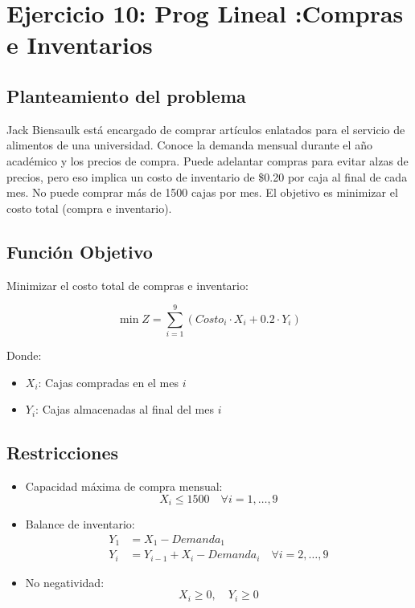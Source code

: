 \documentclass[12pt, a4paper, oneside]{book}
\theoremstyle{definition}
\begin{document}
\newpage
\section{Ejercicio 10: Prog Lineal :Compras e Inventarios}

\subsection{Planteamiento del problema}
Jack Biensaulk está encargado de comprar artículos enlatados para el servicio de alimentos de una universidad. Conoce la demanda mensual durante el año académico y los precios de compra. Puede adelantar compras para evitar alzas de precios, pero eso implica un costo de inventario de \$0.20 por caja al final de cada mes. No puede comprar más de 1500 cajas por mes. El objetivo es minimizar el costo total (compra e inventario).

\subsection{Función Objetivo}
Minimizar el costo total de compras e inventario:

\[
\min Z = \sum_{i=1}^{9} (Costo_i \cdot X_i + 0.2 \cdot Y_i)
\]

Donde:
\begin{itemize}
  \item \(X_i\): Cajas compradas en el mes \(i\)
  \item \(Y_i\): Cajas almacenadas al final del mes \(i\)
\end{itemize}

\subsection{Restricciones}

\begin{itemize}
  \item Capacidad máxima de compra mensual:
    \[
    X_i \leq 1500 \quad \forall i = 1,\ldots,9
    \]

  \item Balance de inventario:
  \begin{align*}
    Y_1 &= X_1 - Demanda_1 \\
    Y_i &= Y_{i-1} + X_i - Demanda_i \quad \forall i = 2,\ldots,9
  \end{align*}

  \item No negatividad:
  \[
  X_i \geq 0, \quad Y_i \geq 0
  \]
\end{itemize}
\end{document}
